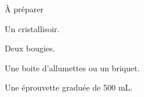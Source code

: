 

\begin{boiteMateriel}{À préparer}
  \begin{listePoints}
    \item Un cristallisoir.
    \item Deux bougies.
    \item Une boite d’allumettes ou un briquet.
    \item Une éprouvette graduée de 500 mL.
  \end{listePoints}
\end{boiteMateriel}